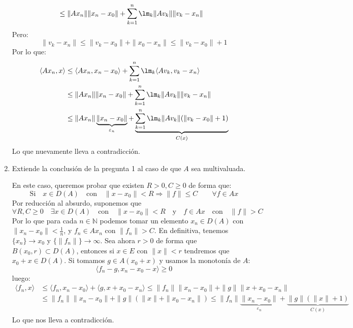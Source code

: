 \begin{ejercicio}
\begin{enumerate}
\begin{align*}
                                       &\leq \|Ax_n\|\|x_n-x_0\| + \sum_{k=1}^{n}\lm_k \|Av_k\|\|v_k-x_n\|
            \end{align*}
            Pero:
            \begin{equation*}
                \|v_k - x_n\| \leq \|v_k - x_0\| + \|x_0 - x_n\| \leq \|v_k - x_0\| + 1
            \end{equation*}
            Por lo que:
            \begin{align*}
                \langle Ax_n,x \rangle &\leq \langle Ax_n, x_n-x_0 \rangle + \sum_{k=1}^{n}\lm_k\langle Av_k, v_k - x_n \rangle  \\
                                       &\leq \|Ax_n\|\|x_n-x_0\| + \sum_{k=1}^{n}\lm_k \|Av_k\|\|v_k-x_n\| \\
                                       &\leq \|Ax_n\|\underbrace{\|x_n-x_0\|}_{\varepsilon_n} + \underbrace{\sum_{k=1}^{n}\lm_k \|Av_k\|(\|v_k-x_0\|+1)}_{C(x)}
            \end{align*}
            Lo que nuevamente lleva a contradicción.
        \item Extiende la conclusión de la pregunta 1 al caso de que $A$ sea multivaluada.

            En este caso, queremos probar que existen $R>0,C\geq 0$ de forma que:
            \begin{equation*}
                \text{Si}\quad  x\in D(A) \quad \text{con}\quad \|x-x_0\|<R \Longrightarrow \|f\| \leq C \qquad \forall f\in Ax
            \end{equation*}
            Por reducción al absurdo, suponemos que
            \begin{equation*}
                \forall R,C\geq 0 \quad \exists  x\in D(A) \quad \text{con}\quad \|x-x_0\|<R \quad \text{y}\quad f\in Ax \quad \text{con}\quad  \|f\| > C 
            \end{equation*}
            Por lo que para cada $n\in \mathbb{N}$ podemos tomar un elemento $x_n\in D(A)$ con $\|x_n-x_0\| < \frac{1}{n}$, y $f_n\in Ax_n$ con $\|f_n\|>C$. En definitiva, tenemos $\{x_n\}\to x_0$ y $\{\|f_n\|\}\to \infty$. Sea ahora $r>0$ de forma que $B(x_0,r)\subset D(A)$, entonces si $x\in E$ con $\|x\|<r$ tendremos que $x_0+x\in D(A)$. Si tomamos $g\in A(x_0+x)$ y usamos la monotonía de $A$:
            \begin{equation*}
                \langle f_n - g,x_n-x_0-x \rangle \geq 0
            \end{equation*}
            luego:
            \begin{align*}
                \langle f_n,x \rangle &\leq \langle f_n,x_n-x_0 \rangle  + \langle g,x+x_0-x_n \rangle  \leq \|f_n\|\|x_n-x_0\| + \|g\|\|x + x_0 - x_n\| \\
                                      &\leq \|f_n\|\|x_n-x_0\| + \|g\|(\|x\| + \|x_0-x_n\|) \leq \|f_n\|\underbrace{\|x_n-x_0\|}_{\varepsilon_n} + \underbrace{\|g\|(\|x\|+1)}_{C(x)}
            \end{align*}
            Lo que nos lleva a contradicción.
    \end{enumerate}
\end{ejercicio}

